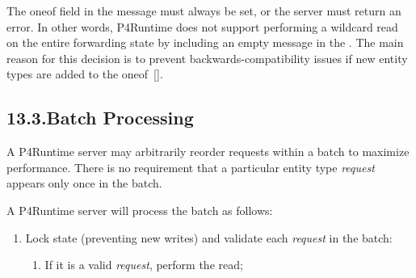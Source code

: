 \documentclass[11pt]{article}
\begin{document}
{%
\noindent{}The  oneof field in the  message must always be set, or the
server must return an  error. In other words, P4Runtime does
not support performing a wildcard read on the entire forwarding state by
including an empty  message in the . The main reason for
this decision is to prevent backwards-compatibility issues if new entity types
are added to the  oneof~[].%

\subsection{13.3.\hspace*{0.5em}Batch Processing}\label{sec-batch-processing}%

\noindent{}A P4Runtime server may arbitrarily reorder requests within a batch to maximize
performance. There is no requirement that a particular entity type \emph{request}
appears only once in the batch.%

A P4Runtime server will process the batch as follows:%

\begin{enumerate}%

\item{}
Lock state (preventing new writes) and validate each \emph{request} in the batch:%

\begin{enumerate}%

\item{}
If it is a valid \emph{request}, perform the read;%


\end{enumerate}
\end{enumerate}}
\end{document}
